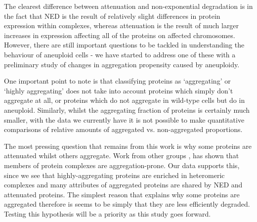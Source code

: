 \documentclass[a4paper,11pt,twoside,openright]{scrbook}
\begin{document}
The clearest difference between attenuation and non-exponential degradation is in the fact that NED is the result of relatively slight differences in protein expression within complexes, whereas attenuation is the result of much larger increases in expression affecting all of the proteins on affected chromosomes. However, there are still important questions to be tackled in understanding the behaviour of aneuploid cells - we have started to address one of these with a preliminary study of changes in aggregation propensity caused by aneuploidy.

One important point to note is that classifying proteins as `aggregating' or `highly aggregating' does not take into account proteins which simply don't aggregate at all, or proteins which do not aggregate in wild-type cells but do in aneuploid. Similarly, whilst the aggregating fraction of proteins is certainly much smaller, with the data we currently have it is not possible to make quantitative comparisons of relative amounts of aggregated vs. non-aggregated proportions.

The most pressing question that remains from this work is why some proteins are attenuated whilst others aggregate. Work from other groups \cite{Pechmann2009, Yang2012}, has shown that members of protein complexes are aggregation-prone. Our data supports this, since we see that highly-aggregating proteins are enriched in heteromeric complexes and many attributes of aggregated proteins are shared by NED and attenuated proteins. The simplest reason that explains why some proteins are aggregated therefore is seems to be simply that they are less efficiently degraded. Testing this hypothesis will be a priority as this study goes forward.
\end{document}
